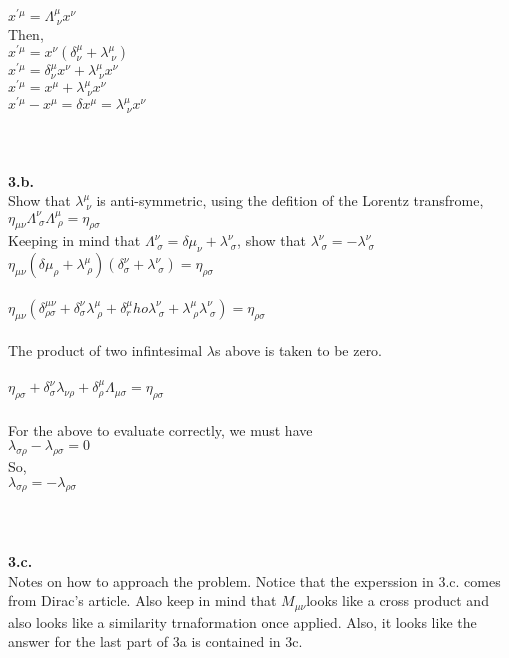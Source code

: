 \documentclass[prb,preprint]
{revtex4-1}
\newcommand{\PRLsep}{\noindent\makebox[\linewidth]{\resizebox{0.8888\linewidth}{2pt}{$\bullet$}}\bigskip}
\begin{document}
$x^{\prime\mu} = \Lambda^\mu_{\;\nu} x^\nu$
\\
Then,
\\
$x^{\prime\mu} = x^\nu\left(\delta^\mu_\nu + \lambda^\mu_{\;\nu}\right) $
\\
$x^{\prime\mu} = \delta^\mu_\nu x^\nu + \lambda^\mu_{\;\nu}x^\nu $
\\
$x^{\prime\mu} = x^\mu + \lambda^\mu_{\;\nu}x^\nu $
\\
$x^{\prime\mu} - x^\mu = \delta x^\mu = \lambda^\mu_{\;\nu}x^\nu $
\\
\\
\PRLsep
\\
\\
\textbf{3.b.}
\\
Show that $\lambda^\mu_{\;\nu}$ is anti-symmetric, using the defition of the Lorentz transfrome, $\eta_{\mu\nu} \Lambda^\nu_{\;\sigma}\Lambda^\mu_{\;\rho} = \eta_{\rho\sigma}$
\\
Keeping in mind that $\Lambda^\nu_{\;\sigma} = \delta\mu_\nu + \lambda^\nu_{\;\sigma}$, show that $\lambda^\nu_{\;\sigma} = -\lambda^\nu_{\;\sigma}$
\\
$\eta_{\mu\nu}\left(\delta\mu_\rho+ \lambda^\mu_{\;\rho}\right)\left(\delta^\nu_\sigma + \lambda^\nu_{\;\sigma}\right) = \eta_{\rho\sigma}$
\\
\\
$\eta_{\mu\nu}\left(\delta^{\mu\nu}_{\rho\sigma} + \delta^\nu_\sigma \lambda^\mu_{\;\rho} + \delta^\mu_rho \lambda^\nu_{\;\sigma} + \lambda^\mu_{\;\rho}\lambda^\nu_{\;\sigma}\right) = \eta_{\rho\sigma}$
\\
\\
The product of two infintesimal $\lambda$s above is taken to be zero.
\\
\\
$\eta_{\rho\sigma} + \delta^\nu_\sigma \lambda_{\nu\rho} + \delta^\mu_\rho\Lambda_{\mu\sigma} = \eta_{\rho\sigma}$
\\
\\
For the above to evaluate correctly, we must have 
\\
$\lambda_{\sigma\rho} - \lambda_{\rho\sigma} = 0$
\\
So, 
\\
$\lambda_{\sigma\rho} = -\lambda_{\rho\sigma}$
\\
\\
\PRLsep
\\
\\
\newpage
\textbf{3.c.}
\\
Notes on how to approach the problem.  Notice that the experssion in 3.c. comes from Dirac's article.  Also keep in mind that $M_{\mu\nu}$looks like a cross product and also looks like a similarity trnaformation once applied.  Also, it looks like the answer for the last part of 3a is contained in 3c. 
\end{document}

